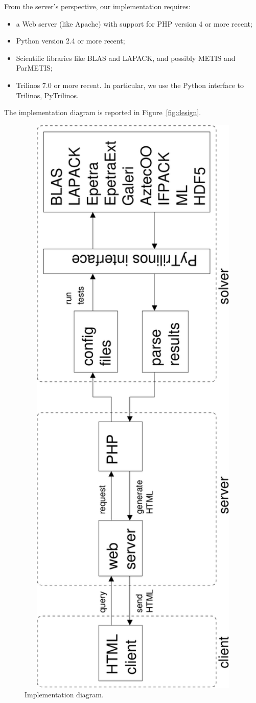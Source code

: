 \documentclass[11pt,relax]{SANDreport}
\begin{document}
From the server's perspective, our implementation requires:
\begin{itemize}
\item a Web server (like Apache) with support for PHP version 4 or more recent;
\item Python version 2.4 or more recent;
\item Scientific libraries like BLAS and LAPACK, and possibly METIS and
ParMETIS;
\item Trilinos 7.0 or more recent. 
In particular, we use the Python interface to Trilinos, PyTrilinos.
\end{itemize}
The implementation diagram is reported in Figure~\ref{fig:design}.
\begin{figure}
\begin{center}
\includegraphics[width=14cm]{diagram}
\caption{Implementation diagram.}
\labe
\end{center}
\end{figure}
\end{document}
